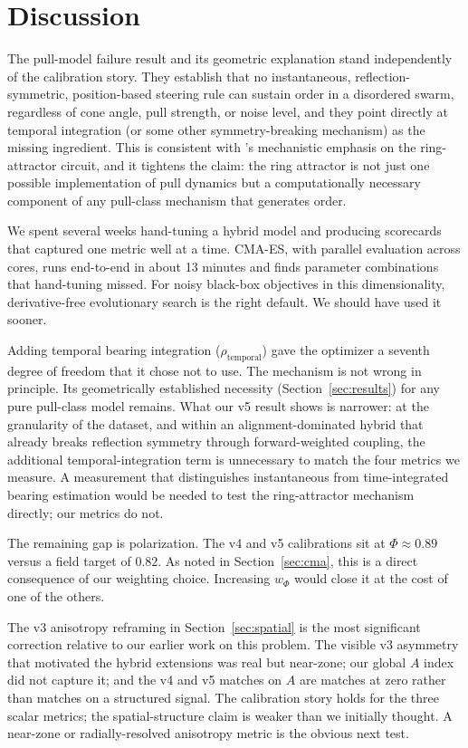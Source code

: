 \documentclass[11pt]{article}
\begin{document}
\section{Discussion}
\label{sec:discussion}

The pull-model failure result and its geometric explanation stand
independently of the calibration story. They establish that no
instantaneous, reflection-symmetric, position-based steering rule can
sustain order in a disordered swarm, regardless of cone angle, pull
strength, or noise level, and they point directly at temporal integration
(or some other symmetry-breaking mechanism) as the missing ingredient.
This is consistent with \citet{sayin2025}'s mechanistic emphasis on the
ring-attractor circuit, and it tightens the claim: the ring attractor
is not just one possible implementation of pull dynamics but a
computationally necessary component of any pull-class mechanism that
generates order.

We spent several weeks hand-tuning a hybrid model and producing
scorecards that captured one metric well at a time. CMA-ES, with parallel
evaluation across cores, runs end-to-end in about 13 minutes and finds
parameter combinations that hand-tuning missed. For noisy black-box
objectives in this dimensionality, derivative-free evolutionary search
is the right default. We should have used it sooner.

Adding temporal bearing integration ($\rho_\text{temporal}$) gave the
optimizer a seventh degree of freedom that it chose not to use. The
mechanism is not wrong in principle. Its geometrically established
necessity (Section~\ref{sec:results}) for any pure pull-class model
remains. What our v5 result shows is narrower: at the granularity of the
\citet{weinburd2024} dataset, and within an alignment-dominated hybrid
that already breaks reflection symmetry through forward-weighted
coupling, the additional temporal-integration term is unnecessary to
match the four metrics we measure. A measurement that distinguishes
instantaneous from time-integrated bearing estimation would be needed
to test the ring-attractor mechanism directly; our metrics do not.

The remaining gap is polarization. The v4 and v5 calibrations sit at
$\Phi \approx 0.89$ versus a field target of $0.82$. As noted in
Section~\ref{sec:cma}, this is a direct consequence of our weighting
choice. Increasing $w_\Phi$ would close it at the cost of one of the
others.

The v3 anisotropy reframing in Section~\ref{sec:spatial} is the most
significant correction relative to our earlier work on this problem. The
visible v3 asymmetry that motivated the hybrid extensions was real but
near-zone; our global $A$ index did not capture it; and the v4 and v5
matches on $A$ are matches at zero rather than matches on a structured
signal. The calibration story holds for the three scalar metrics; the
spatial-structure claim is weaker than we initially thought. A
near-zone or radially-resolved anisotropy metric is the obvious next
test.
\end{document}
